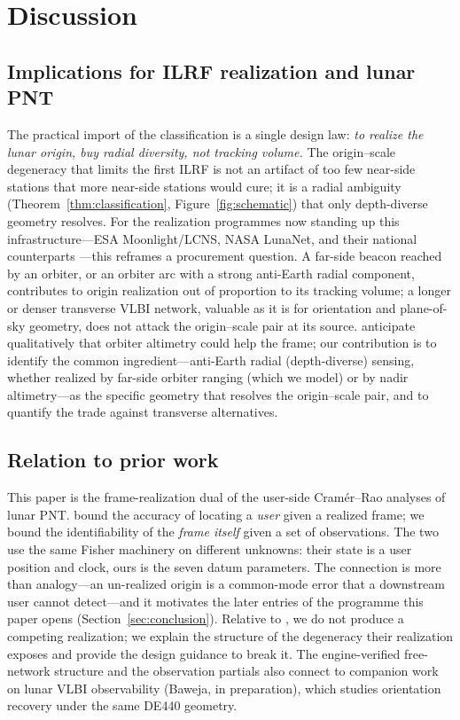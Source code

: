\section{Discussion}
\label{sec:discussion}

\subsection{Implications for ILRF realization and lunar PNT}

The practical import of the classification is a single design law: \emph{to realize
the lunar origin, buy radial diversity, not tracking volume.} The origin--scale
degeneracy that limits the first ILRF \citep{sosnica2025ilrf} is not an artifact of
too few near-side stations that more near-side stations would cure; it is a radial
ambiguity (Theorem~\ref{thm:classification}, Figure~\ref{fig:schematic}) that only
depth-diverse geometry resolves. For the realization programmes now standing up
this infrastructure---ESA Moonlight/LCNS, NASA LunaNet, and their national
counterparts \citep{israel2020lunanet,fienga2024moonlight}---this reframes a
procurement question. A far-side beacon reached by an orbiter, or an orbiter arc
with a strong anti-Earth radial component, contributes to origin realization out of
proportion to its tracking volume; a longer or denser transverse VLBI network,
valuable as it is for orientation and plane-of-sky geometry, does not attack the
origin--scale pair at its source. \citet{fienga2024moonlight} anticipate
qualitatively that orbiter altimetry could help the frame; our contribution is to
identify the common ingredient---anti-Earth radial (depth-diverse) sensing,
whether realized by far-side orbiter ranging (which we model) or by nadir
altimetry---as the specific geometry that resolves the origin--scale pair, and to
quantify the trade against transverse alternatives.

\subsection{Relation to prior work}

This paper is the frame-realization dual of the user-side Cram\'er--Rao analyses of
lunar PNT. \citet{pohlmann2025hybrid} bound the accuracy of locating a
\emph{user} given a realized frame; we bound the identifiability of the \emph{frame
itself} given a set of observations. The two use the same Fisher machinery on
different unknowns: their state is a user position and clock, ours is the seven
datum parameters. The connection is more than analogy---an un-realized origin is a
common-mode error that a downstream user cannot detect---and it motivates the later
entries of the programme this paper opens (Section~\ref{sec:conclusion}). Relative
to \citet{sosnica2025ilrf}, we do not produce a competing realization; we explain
the structure of the degeneracy their realization exposes and provide the design
guidance to break it. The engine-verified free-network structure and the
observation partials also connect to companion work on lunar VLBI observability
(Baweja, in preparation), which studies orientation recovery under the same DE440
geometry.

